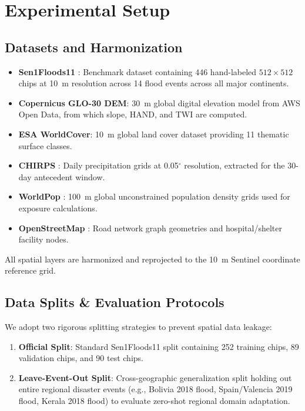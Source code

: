 \documentclass[journal]{IEEEtran}
\begin{document}
\section{Experimental Setup}
\label{sec:exp}

\subsection{Datasets and Harmonization}
\begin{itemize}
    \item \textbf{Sen1Floods11} \cite{bonafilia2020sen1floods11}: Benchmark dataset containing 446 hand-labeled $512 \times 512$ chips at 10~m resolution across 14 flood events across all major continents.
    \item \textbf{Copernicus GLO-30 DEM}: 30~m global digital elevation model from AWS Open Data, from which slope, HAND, and TWI are computed.
    \item \textbf{ESA WorldCover}: 10~m global land cover dataset providing 11 thematic surface classes.
    \item \textbf{CHIRPS} \cite{funk2015}: Daily precipitation grids at 0.05$^\circ$ resolution, extracted for the 30-day antecedent window.
    \item \textbf{WorldPop} \cite{lloyd2019}: 100~m global unconstrained population density grids used for exposure calculations.
    \item \textbf{OpenStreetMap} \cite{haklay2008}: Road network graph geometries and hospital/shelter facility nodes.
\end{itemize}
All spatial layers are harmonized and reprojected to the 10~m Sentinel coordinate reference grid.

\subsection{Data Splits & Evaluation Protocols}
We adopt two rigorous splitting strategies to prevent spatial data leakage:
\begin{enumerate}
    \item \textbf{Official Split}: Standard Sen1Floods11 split containing 252 training chips, 89 validation chips, and 90 test chips.
    \item \textbf{Leave-Event-Out Split}: Cross-geographic generalization split holding out entire regional disaster events (e.g., Bolivia 2018 flood, Spain/Valencia 2019 flood, Kerala 2018 flood) to evaluate zero-shot regional domain adaptation.
\end{enumerate}
\end{document}
